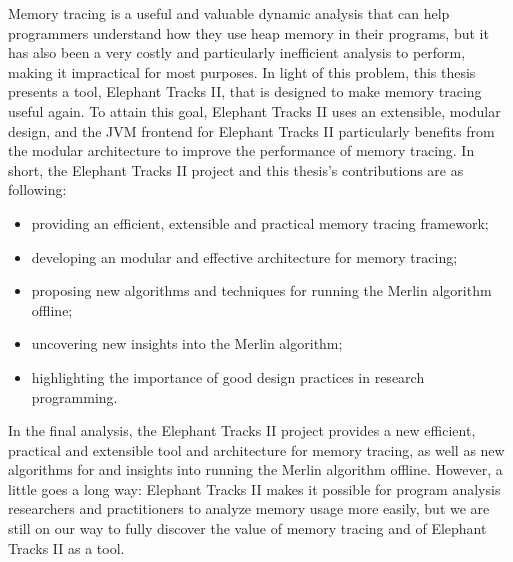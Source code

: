 Memory tracing is a useful and valuable dynamic analysis that can help programmers understand how they use heap memory in their programs, but it has
also been a very costly and particularly inefficient analysis to perform, making it impractical for most purposes. In light of this problem, this thesis
presents a tool, Elephant Tracks II, that is designed to make memory tracing useful again. To attain this goal, Elephant Tracks II uses an extensible, modular
design, and the JVM frontend for Elephant Tracks II particularly benefits from the modular architecture to improve the performance of memory tracing. In short,
the Elephant Tracks II project and this thesis's contributions are as following:
\begin{itemize}
\item providing an efficient, extensible and practical memory tracing framework;
\item developing an modular and effective architecture for memory tracing;
\item proposing new algorithms and techniques for running the Merlin algorithm offline;
\item uncovering new insights into the Merlin algorithm;
\item highlighting the importance of good design practices in research programming.
\end{itemize}

In the final analysis, the Elephant Tracks II project provides a new efficient, practical and extensible tool and architecture for memory tracing, as well as
new algorithms for and insights into running the Merlin algorithm offline. However, a little goes a long way: Elephant Tracks II makes it possible for program
analysis researchers and practitioners to analyze memory usage more easily, but we are still on our way to fully discover the value of memory tracing and of
Elephant Tracks II as a tool.

